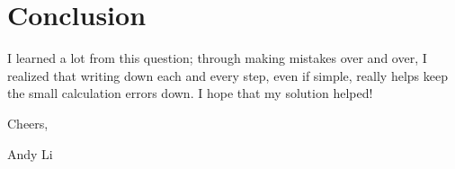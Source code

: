 \documentclass[letterpaper, 12pt]{article}
\begin{document}
\section{Conclusion}
I learned a lot from this question; through making mistakes over and over, I realized that writing down each and every step, even if simple, really helps keep the small calculation errors down. I hope that my solution helped!
\bigskip
\par
Cheers, 
\par
Andy Li
\end{document}
